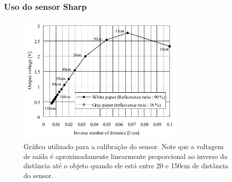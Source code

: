 \documentclass{beamer}
\begin{document}
\begin{frame}
\frametitle{Uso do sensor Sharp}
\begin{minipage}{\textwidth}

	\begin{figure}[!ht]
		\vspace{-2pt}
		\centering
		\includegraphics[width=0.75\textwidth]{grafico_calibracao_sensor.png}
		\vspace{-10pt}
		\caption{Gráfico utilizado para a calibração do sensor. Note que a voltagem de saída é aproximadamente linearmente proporcional ao inverso da distância até o objeto quando ele está entre 20 e 150cm de distância do sensor.}
		\label{fig:aligfgfmentacdffdao_usb}
	\end{figure}

\end{minipage}
\end{frame}
\end{document}
